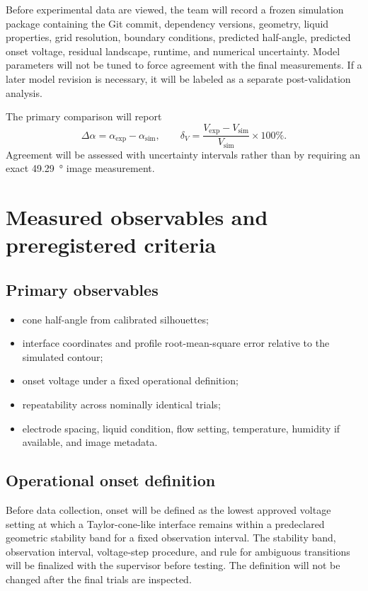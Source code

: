 \documentclass[11pt]{article}
\begin{document}
Before experimental data are viewed, the team will record a frozen simulation package containing the Git commit, dependency versions, geometry, liquid properties, grid resolution, boundary conditions, predicted half-angle, predicted onset voltage, residual landscape, runtime, and numerical uncertainty. Model parameters will not be tuned to force agreement with the final measurements. If a later model revision is necessary, it will be labeled as a separate post-validation analysis.

The primary comparison will report
\begin{equation}
\Delta \alpha = \alpha_{\mathrm{exp}}-\alpha_{\mathrm{sim}},
\qquad
\delta_V = \frac{V_{\mathrm{exp}}-V_{\mathrm{sim}}}{V_{\mathrm{sim}}}\times 100\%.
\end{equation}
Agreement will be assessed with uncertainty intervals rather than by requiring an exact \SI{49.29}{\degree} image measurement.

\section{Measured observables and preregistered criteria}

\subsection{Primary observables}
\begin{itemize}
    \item cone half-angle from calibrated silhouettes;
    \item interface coordinates and profile root-mean-square error relative to the simulated contour;
    \item onset voltage under a fixed operational definition;
    \item repeatability across nominally identical trials;
    \item electrode spacing, liquid condition, flow setting, temperature, humidity if available, and image metadata.
\end{itemize}

\subsection{Operational onset definition}

Before data collection, onset will be defined as the lowest approved voltage setting at which a Taylor-cone-like interface remains within a predeclared geometric stability band for a fixed observation interval. The stability band, observation interval, voltage-step procedure, and rule for ambiguous transitions will be finalized with the supervisor before testing. The definition will not be changed after the final trials are inspected.
\end{document}
